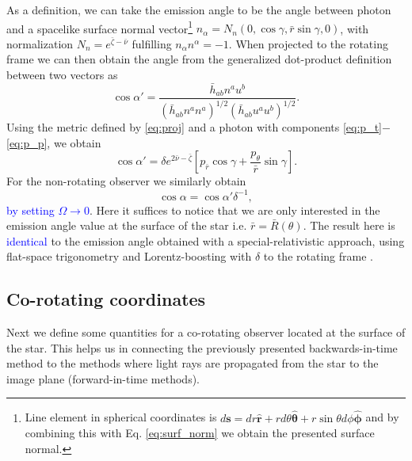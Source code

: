 \documentclass{aa}
\newcommand{\be}{\begin{equation}}
\newcommand{\ee}{\end{equation}}
\renewcommand{\vec}[1]{\ensuremath{\boldsymbol{#1}}}
\newcommand{\refe}[1]{\textcolor{blue}{{#1}}}
\newcommand{\refedel}[1]{}
\newcommand{\rb}{\ensuremath{\bar{r}}}
\newcommand{\nub}{\ensuremath{\bar{\nu}}}
\newcommand{\zetab}{\ensuremath{\bar{\zeta}}}
\begin{document}
As a definition, we can take the emission angle to be the angle between photon and a spacelike surface normal vector\footnote{
Line element in spherical coordinates is $d\vec{s} = dr \vec{\hat{r}} + r d\theta \vec{\hat{\theta}} + r \sin\theta d\phi \vec{\hat{\phi}}$ and by combining this with Eq. \eqref{eq:surf_norm} we obtain the presented surface normal.
}
$n_{\alpha} = N_n (0, \cos\gamma, \rb \sin\gamma, 0)$, with normalization $N_n = e^{\zetab - \nub}$ fulfilling $n_{\alpha}n^{\alpha} = -1$.  
When projected to the rotating frame we can then obtain the angle from the generalized dot-product definition between two vectors as
\be\label{eq:gen_angle}
\cos\alpha' = \frac{\bar{h}_{ab}n^a u^b}{(\bar{h}_{ab} n^a n^a)^{1/2} (\bar{h}_{ab} u^a u^b)^{1/2}}.
\ee
Using the metric defined by \eqref{eq:proj} and a photon with components \eqref{eq:p_t}$-$\eqref{eq:p_p}, we obtain
\be\label{eq:cosap}
\cos\alpha' = \delta e^{2\nub-\zetab} \left[ p_{\rb} \cos\gamma + \frac{p_{\theta}}{\rb}\sin\gamma \right].
\ee
For the non-rotating observer we similarly obtain 
\be\label{eq:cosa}
\cos\alpha = \cos\alpha' \delta^{-1},
\ee
\refe{by setting $\Omega \rightarrow 0$}.
Here it suffices to notice that we are only interested in the emission angle value at the surface of the star i.e. $\rb = \bar{R}(\theta)$.
The result here is \refe{identical} to the emission angle obtained with a special-relativistic approach, using flat-space trigonometry and Lorentz-boosting with $\delta$ to the rotating frame \citep[see e.g.,][]{PB06}.



\subsection{Co-rotating coordinates\refedel{ frame}}\label{sect:coords}
Next we define some quantities for a co-rotating observer located at the surface of the star.
This helps us in connecting the previously presented backwards-in-time method to the methods where light rays are propagated from the star to the image plane (forward-in-time methods).
\end{document}
